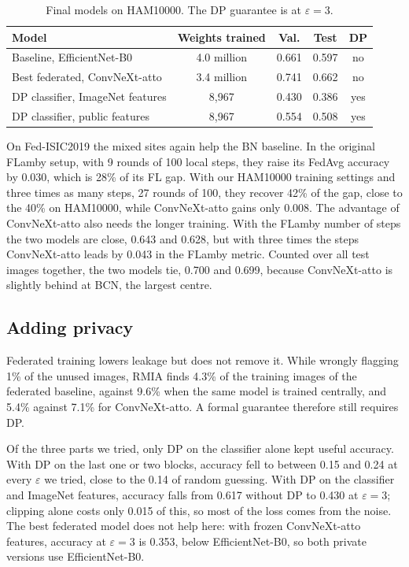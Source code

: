 \documentclass[10pt,twocolumn,a4paper]{article}
\begin{document}
\begin{table}[t]
\caption{Final models on HAM10000. The DP guarantee is at $\varepsilon = 3$.}\label{tab:designs}
\centering\footnotesize\setlength{\tabcolsep}{3.2pt}
\begin{tabular}{lcccc}
\toprule
Model & Weights trained & Val. & Test & DP \\
\midrule
Baseline, EfficientNet-B0 & 4.0 million & 0.661 & 0.597 & no \\
Best federated, ConvNeXt-atto & 3.4 million & 0.741 & 0.662 & no \\
DP classifier, ImageNet features & 8,967 & 0.430 & 0.386 & yes \\
DP classifier, public features & 8,967 & 0.554 & 0.508 & yes \\
\bottomrule
\end{tabular}
\end{table}

On Fed-ISIC2019 the mixed sites again help the BN baseline. In the original FLamby setup, with 9 rounds of 100 local steps, they raise its FedAvg accuracy by 0.030, which is 28\% of its FL gap. With our HAM10000 training settings and three times as many steps, 27 rounds of 100, they recover 42\% of the gap, close to the 40\% on HAM10000, while ConvNeXt-atto gains only 0.008. The advantage of ConvNeXt-atto also needs the longer training. With the FLamby number of steps the two models are close, 0.643 and 0.628, but with three times the steps ConvNeXt-atto leads by 0.043 in the FLamby metric. Counted over all test images together, the two models tie, 0.700 and 0.699, because ConvNeXt-atto is slightly behind at BCN, the largest centre.

\subsection{Adding privacy}
Federated training lowers leakage but does not remove it. While wrongly flagging 1\% of the unused images, RMIA finds 4.3\% of the training images of the federated baseline, against 9.6\% when the same model is trained centrally, and 5.4\% against 7.1\% for ConvNeXt-atto. A formal guarantee therefore still requires DP.

Of the three parts we tried, only DP on the classifier alone kept useful accuracy. With DP on the last one or two blocks, accuracy fell to between 0.15 and 0.24 at every $\varepsilon$ we tried, close to the 0.14 of random guessing. With DP on the classifier and ImageNet features, accuracy falls from 0.617 without DP to 0.430 at $\varepsilon = 3$; clipping alone costs only 0.015 of this, so most of the loss comes from the noise. The best federated model does not help here: with frozen ConvNeXt-atto features, accuracy at $\varepsilon = 3$ is 0.353, below EfficientNet-B0, so both private versions use EfficientNet-B0.
\end{document}

